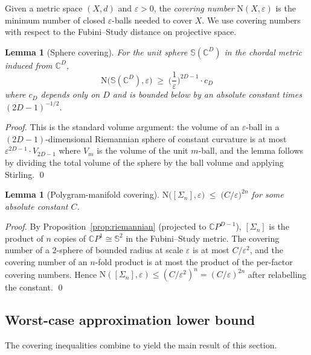 \documentclass[11pt,letterpaper]{article}
\newtheorem{lemma}[theorem]{Lemma}
\theoremstyle{definition}
\newcommand{\C}{\mathbb{C}}
\newcommand{\Sphere}{\mathbb{S}}
\newcommand{\Cov}{\mathrm{N}}
\begin{document}
Given a metric space $(X, d)$ and $\varepsilon > 0$, the \emph{covering number}
$\Cov(X, \varepsilon)$ is the minimum number of closed $\varepsilon$-balls
needed to cover $X$. We use covering numbers with respect to the Fubini--Study
distance on projective space.

\begin{lemma}[Sphere covering]
\label{lem:cover-sphere}
For the unit sphere $\Sphere(\C^{D})$ in the chordal metric induced from
$\C^{D}$,
\[
\Cov\!\big(\Sphere(\C^{D}), \varepsilon\big)
   \;\geq\; \bigg(\frac{1}{\varepsilon}\bigg)^{2D - 1}
   \cdot c_{D}
\]
where $c_{D}$ depends only on $D$ and is bounded below by an absolute constant
times $(2D - 1)^{-1/2}$.
\end{lemma}
\begin{proof}
This is the standard volume argument: the volume of an $\varepsilon$-ball in a
$(2D - 1)$-dimensional Riemannian sphere of constant curvature is at most
$\varepsilon^{2D-1} \cdot V_{2D-1}$ where $V_{m}$ is the volume of the unit
$m$-ball, and the lemma follows by dividing the total volume of the sphere by
the ball volume and applying Stirling. \qed
\end{proof}

\begin{lemma}[Polygram-manifold covering]
\label{lem:cover-polygram}
$\Cov\!\big([\Sigma_{n}], \varepsilon\big) \;\leq\;
   \big(C/\varepsilon\big)^{2n}$
for some absolute constant $C$.
\end{lemma}
\begin{proof}
By Proposition~\ref{prop:riemannian} (projected to $\C P^{D-1}$),
$[\Sigma_{n}]$ is the product of $n$ copies of $\C P^{1} \cong \Sphere^{2}$
in the Fubini--Study metric. The covering number of a $2$-sphere of bounded
radius at scale $\varepsilon$ is at most $C/\varepsilon^{2}$, and the covering
number of an $n$-fold product is at most the product of the per-factor
covering numbers. Hence
$\Cov([\Sigma_{n}], \varepsilon) \leq (C/\varepsilon^{2})^{n}
   = (C/\varepsilon)^{2n}$ after relabelling the constant. \qed
\end{proof}

\subsection{Worst-case approximation lower bound}

The covering inequalities combine to yield the main result of this section.
\end{document}
